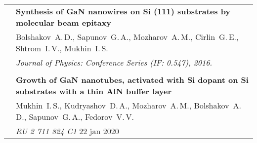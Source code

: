 \documentclass[letterpaper, 11pt]{article}
\begin{document}
\begin{longtable}{p{1.3in}p{4.8in}}
        & \textbf{Synthesis of GaN nanowires on Si (111) substrates by
        molecular beam epitaxy} \\
        & Bolshakov~A.\,D., Sapunov~G.\,A., Mozharov~A.\,M., Cirlin~G.\,E.,
        Shtrom~I.\,V., Mukhin~I.\,S. \\
        & \textit{Journal of Physics: Conference Series (IF: 0.547), 2016.}\\
		& \\

		{\color{OliveGreen}{Patent}}
        & \textbf{Growth of GaN nanotubes, activated with Si dopant on Si substrates
        with a thin AlN buffer layer} \\
        & Mukhin~I.\,S., Kudryashov~D.\,A., Mozharov~A.\,M., Bolshakov~A.\,D.,
        Sapunov~G.\,A., Fedorov~V.\,V. \\
        & \textit{RU 2 711 824 C1} \hfill 22 jan 2020 \\
		
		
		
		
	\end{longtable}
\end{document}
